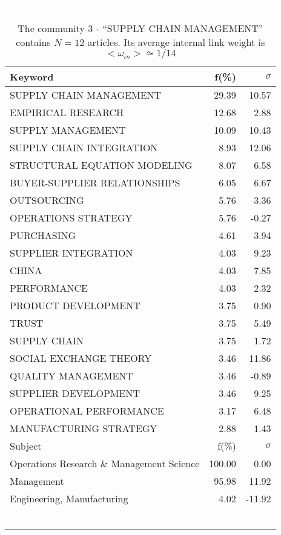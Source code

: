 \documentclass[a4paper,11pt]{report}
\begin{document}
\begin{landscape}
\clearpage

\begin{table}[!ht]
\caption{The community 3 - ``SUPPLY CHAIN MANAGEMENT'' contains $N = 12$ articles. Its average internal link weight is $<\omega_{in}> \simeq 1/14$ }
\textcolor{white}{aa}\\
{\scriptsize\begin{tabular}{|l r r|}
\hline
Keyword & f(\%) & $\sigma$\\
\hline
SUPPLY CHAIN MANAGEMENT & 29.39 & 10.57\\
EMPIRICAL RESEARCH & 12.68 & 2.88\\
SUPPLY MANAGEMENT & 10.09 & 10.43\\
SUPPLY CHAIN INTEGRATION & 8.93 & 12.06\\
STRUCTURAL EQUATION MODELING & 8.07 & 6.58\\
BUYER-SUPPLIER RELATIONSHIPS & 6.05 & 6.67\\
OUTSOURCING & 5.76 & 3.36\\
OPERATIONS STRATEGY & 5.76 & -0.27\\
PURCHASING & 4.61 & 3.94\\
SUPPLIER INTEGRATION & 4.03 & 9.23\\
CHINA & 4.03 & 7.85\\
PERFORMANCE & 4.03 & 2.32\\
PRODUCT DEVELOPMENT & 3.75 & 0.90\\
TRUST & 3.75 & 5.49\\
SUPPLY CHAIN & 3.75 & 1.72\\
SOCIAL EXCHANGE THEORY & 3.46 & 11.86\\
QUALITY MANAGEMENT & 3.46 & -0.89\\
SUPPLIER DEVELOPMENT & 3.46 & 9.25\\
OPERATIONAL PERFORMANCE & 3.17 & 6.48\\
MANUFACTURING STRATEGY & 2.88 & 1.43\\
\hline
\hline
Subject & f(\%) & $\sigma$\\
\hline
Operations Research \& Management Science & 100.00 & 0.00\\
Management & 95.98 & 11.92\\
Engineering, Manufacturing & 4.02 & -11.92\\
 &  & \\
 &  & \\
 &  & \\
 &  & \\
 &  & \\
 &  & \\

\end{tabular}}
\end{table}
\end{landscape}
\end{document}

